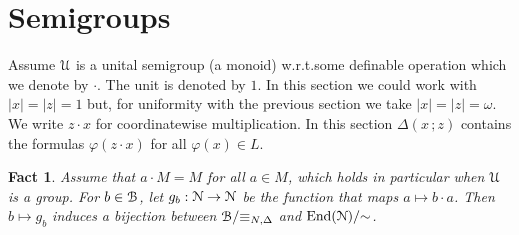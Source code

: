 \documentclass{amsproc}
\def\U{\EuScript U}
\def\B{\EuScript B}
\def\N{\EuScript N}
\def\phi{\varphi}
\newcounter{thm}
\theoremstyle{mio}
\newtheorem{fact}[thm]{Fact}\tcolorboxenvironment{fact}{mythm}
\begin{document}






\section{Semigroups}\label{semigroups}

Assume $\U$ is a unital semigroup (a monoid) w.r.t.\@ some definable operation which we denote by $\cdot$.
The unit is denoted by $1$.
In this section we could work with $|x|=|z|=1$ but, for uniformity with the previous section we take $|x|=|z|=\omega$.
We write $z\cdot x$ for coordinatewise multiplication.
In this section $\Delta(x\,;z)$ contains the formulas $\phi(z\cdot x)$ for all $\phi(x)\in L$.

\begin{fact}
  Assume that $a\cdot M=M$ for all $a\in M$, which holds in particular when $\U$ is a group.
  For $b\in\B$, let $g_b:\N\to\N$ be the function that maps $a\mapsto b\cdot a$.
  Then $b\mapsto g_b$ induces a bijection between $\B/{\equiv_{N,\Delta}}$ and ${\rm End}(\N)/{\sim}$.
\end{fact}
\end{document}
